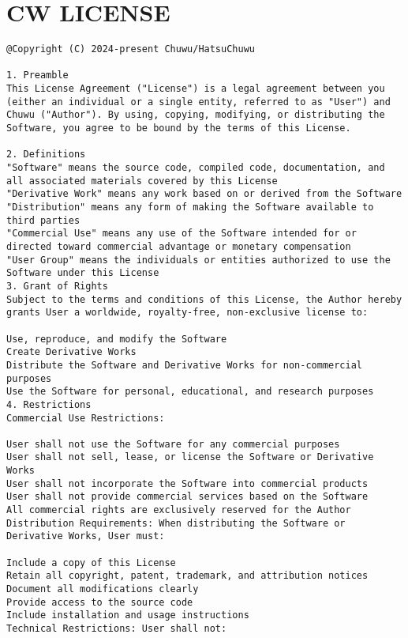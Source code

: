 \section{CW LICENSE}
\begin{verbatim}
@Copyright (C) 2024-present Chuwu/HatsuChuwu

1. Preamble
This License Agreement ("License") is a legal agreement between you (either an individual or a single entity, referred to as "User") and Chuwu ("Author"). By using, copying, modifying, or distributing the Software, you agree to be bound by the terms of this License.

2. Definitions
"Software" means the source code, compiled code, documentation, and all associated materials covered by this License
"Derivative Work" means any work based on or derived from the Software
"Distribution" means any form of making the Software available to third parties
"Commercial Use" means any use of the Software intended for or directed toward commercial advantage or monetary compensation
"User Group" means the individuals or entities authorized to use the Software under this License
3. Grant of Rights
Subject to the terms and conditions of this License, the Author hereby grants User a worldwide, royalty-free, non-exclusive license to:

Use, reproduce, and modify the Software
Create Derivative Works
Distribute the Software and Derivative Works for non-commercial purposes
Use the Software for personal, educational, and research purposes
4. Restrictions
Commercial Use Restrictions:

User shall not use the Software for any commercial purposes
User shall not sell, lease, or license the Software or Derivative Works
User shall not incorporate the Software into commercial products
User shall not provide commercial services based on the Software
All commercial rights are exclusively reserved for the Author
Distribution Requirements: When distributing the Software or Derivative Works, User must:

Include a copy of this License
Retain all copyright, patent, trademark, and attribution notices
Document all modifications clearly
Provide access to the source code
Include installation and usage instructions
Technical Restrictions: User shall not:


\end{verbatim}
